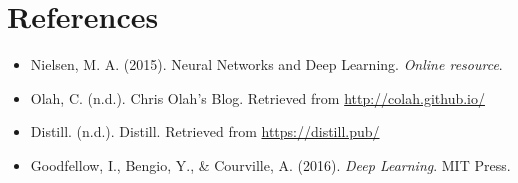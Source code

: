 \documentclass[11pt,a4paper]{article}
\begin{document}
\section{References}
\begin{itemize}
    \item Nielsen, M. A. (2015). Neural Networks and Deep Learning. \textit{Online resource}.
    \item Olah, C. (n.d.). Chris Olah's Blog. Retrieved from \url{http://colah.github.io/}
    \item Distill. (n.d.). Distill. Retrieved from \url{https://distill.pub/}
    \item Goodfellow, I., Bengio, Y., \& Courville, A. (2016). \textit{Deep Learning}. MIT Press.
\end{itemize}
\end{document}
